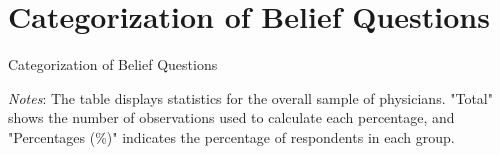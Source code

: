 \documentclass[11pt]{article}
\theoremstyle{definition}
\begin{document}
\section{Categorization of Belief Questions} 

\begin{table}[H]
    \centering
    \caption{Categorization of Belief Questions}
        \begin{adjustbox}{width=0.95\linewidth} 

\end{adjustbox}
     \parbox{\linewidth}{
        	\vspace{.2cm}
        		\scriptsize{\scriptsize{{\emph{Notes}: The table displays statistics for the overall sample of physicians. "Total" shows the number of observations used to calculate each percentage, and "Percentages (\%)" indicates the percentage of respondents in each group.}}}}
    \label{tab:ai_table}
\end{table}

\end{document}

